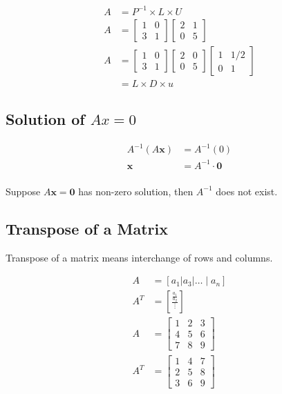 \documentclass[main.tex]{subfiles}
\begin{document}
    $$
    \begin{aligned}
    A &= P^{-1} \times L \times U\\
    A & =\left[\begin{array}{ll}
    1 & 0 \\
    3 & 1
    \end{array}\right]\left[\begin{array}{ll}
    2 & 1 \\
    0 & 5
    \end{array}\right]\\
    A &= \left[\begin{array}{ll}
    1 & 0 \\
    3 & 1
    \end{array}\right]\left[\begin{array}{ll}
    2 & 0 \\
    0 & 5
    \end{array}\right]\left[\begin{array}{ll}
    1 & 1/2 \\
    0 & 1
    \end{array}\right]\\
    & =L \times D \times u
    \end{aligned}
   
    $$
    
\subsection{Solution of $Ax=0$}

    $$
    \begin{aligned}
        A^{-1}(A \bm{x}) & =A^{-1}(0)\\
        \bm{x} & = A^{-1} \cdot \bm{0}\\
    \end{aligned}
    $$

    Suppose $A \bm{x}=\bm{0}$ has non-zero solution, then $A^{-1}$ does not exist.
    
    
\subsection{Transpose of a Matrix}

    Transpose of a matrix means interchange of rows and columns.

    $$
    \begin{aligned}
    A & =\left[a_{1}\left|a_{3}\right| \ldots \mid a_{n}\right]\\
    A^{T} & = \left[\frac{\frac{a_{1}}{a_{2}}}{\vdots}\right]\\
    A &= \left[\begin{array}{lll}
    1 & 2 & 3 \\
    4 & 5 & 6 \\
    7 & 8 & 9
    \end{array}\right]\\
    A^{T} &= \left[\begin{array}{l|l|l}
    1 & 4 & 7 \\
    2 & 5 & 8 \\
    3 & 6 & 9
    \end{array}\right]
    \end{aligned}
    $$
\end{document}
